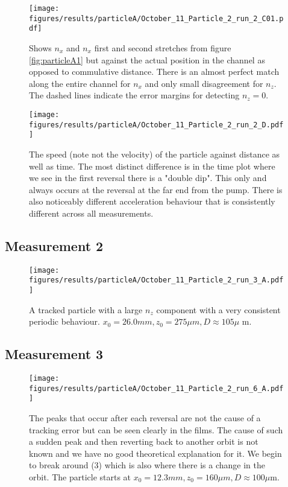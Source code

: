 \begin{figure}[H]
\begin{center}
\texttt{[image: figures/results/particleA/October\_11\_Particle\_2\_run\_2\_C01.pdf]}
\end{center}
\caption{Shows $n_x$ and $n_x$ first and second stretches from figure \ref{fig:particleA1} but against the actual position in the channel as opposed to commulative distance. There is an almost perfect match along the entire channel for $n_x$ and only small disagreement for $n_z$. The dashed lines indicate the error margins for detecting $n_z=0$.}
\label{fig:particleAreversegood}
\end{figure}

\begin{figure}[H]
\begin{center}
\texttt{[image: figures/results/particleA/October\_11\_Particle\_2\_run\_2\_D.pdf]}
\end{center}
\caption{The speed (note not the velocity) of the particle against distance as well as time. The most distinct difference is in the time plot where we see in the first reversal there is a "double dip". This only and always occurs at the reversal at the far end from the pump. There is also noticeably different acceleration behaviour that is consistently different across all measurements.}
\label{fig:particleAspeed}
\end{figure}

\subsection{Measurement 2}

\begin{figure}[H]
\begin{center}
\texttt{[image: figures/results/particleA/October\_11\_Particle\_2\_run\_3\_A.pdf]}
\end{center}
\caption{A tracked particle with a large $n_z$ component with a very consistent periodic behaviour. 
$ x_0 = 26.0 mm, z_0 = 275\mu m, D\approx 105\mu$ m.}
\label{fig:particleA2}
\end{figure}

\subsection{Measurement 3}
\begin{figure}[H]
\begin{center}
\texttt{[image: figures/results/particleA/October\_11\_Particle\_2\_run\_6\_A.pdf]}
\end{center}
\caption{The peaks that occur after each reversal are not the cause of a tracking error but can be seen clearly in the films. The cause of such a sudden peak and then reverting back to another orbit is not known and we have no good theoretical explanation for it. We begin to break around (3) which is also where there is a change in the orbit. The particle starts at $ x_0 = 12.3 mm, z_0 = 160 \mu m, D \approx 100\mu$m.}
\label{fig:particleA3}
\end{figure}



